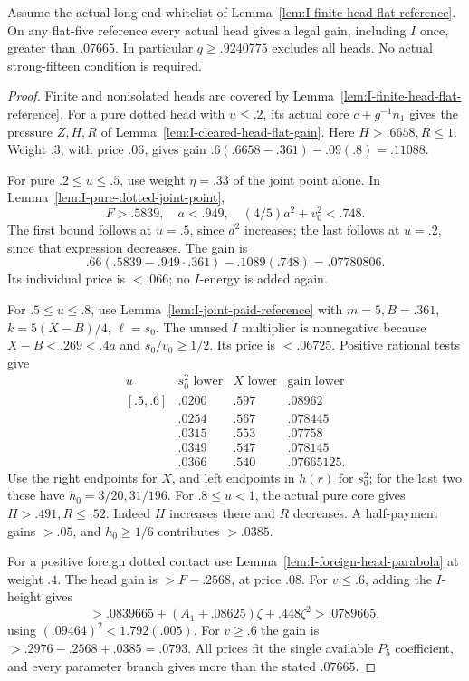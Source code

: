 \begin{lemma}
\label{lem:I-head-flat-reference}
Assume the actual long-end whitelist of
Lemma~\ref{lem:I-finite-head-flat-reference}.
On any flat-five reference every actual head gives a legal gain,
including \(I\) once, greater than \(.07665\).
In particular \(q\ge.9240775\) excludes all heads.
No actual strong-fifteen condition is required.
\end{lemma}
\begin{proof}
Finite and nonisolated heads are covered by
Lemma~\ref{lem:I-finite-head-flat-reference}. For a pure dotted head
with \(u\le.2\), its actual core \(c+g^{-1}n_1\) gives the
pressure \(Z,H,R\) of Lemma~\ref{lem:I-cleared-head-flat-gain}.
Here \(H>.6658,R\le1\). Weight \(.3\), with price \(.06\),
gives gain \(.6(.6658-.361)-.09(.8)=.11088\).

For pure \(.2\le u\le.5\), use weight \(\eta=.33\) of the
joint point alone. In Lemma~\ref{lem:I-pure-dotted-joint-point},
\[
 F>.5839,\quad a<.949,\quad (4/5)a^2+v_0^2<.748.
\]
The first bound follows at \(u=.5\), since \(d^2\) increases;
the last follows at \(u=.2\), since that expression decreases.
The gain is
\[
 .66(.5839-.949\cdot.361)-.1089(.748)=.07780806.
\]
Its individual price is \(<.066\); no \(I\)-energy is added again.

For \(.5\le u\le.8\), use
Lemma~\ref{lem:I-joint-paid-reference} with \(m=5,B=.361\),
\(k=5(X-B)/4\), \(\ell=s_0\). The unused \(I\) multiplier
is nonnegative because \(X-B<.269<.4a\) and \(s_0/v_0\ge1/2\).
Its price is \(<.06725\). Positive rational tests give
\[
\begin{array}{c|c|c|c}
u&s_0^2\text{ lower}&X\text{ lower}&\text{gain lower}\\ \hline
[.5,.6]&.0200&.597&.08962\\
[.6,.7]&.0254&.567&.078445\\
[.7,.75]&.0315&.553&.07758\\
[.75,.775]&.0349&.547&.078145\\
[.775,.8]&.0366&.540&.07665125.
\end{array}
\]
Use the right endpoints for \(X\), and left endpoints in \(h(r)\)
for \(s_0^2\); for the last two these have \(h_0=3/20,31/196\).
For \(.8\le u<1\), the actual pure core gives \(H>.491,R\le.52\).
Indeed \(H\) increases there and \(R\) decreases. A half-payment
gains \(>.05\), and \(h_0\ge1/6\) contributes \(>.0385\).

For a positive foreign dotted contact use
Lemma~\ref{lem:I-foreign-head-parabola} at weight \(.4\).
The head gain is \(>F-.2568\), at price \(.08\).
For \(v\le.6\), adding the \(I\)-height gives
\[
 >.0839665+(A_1+.08625)\zeta+.448\zeta^2>.0789665,
\]
using \((.09464)^2<1.792(.005)\).
For \(v\ge.6\) the gain is \(>.2976-.2568+.0385=.0793\).
All prices fit the single available \(P_5\) coefficient, and every
parameter branch gives more than the stated \(.07665\).
\end{proof}

